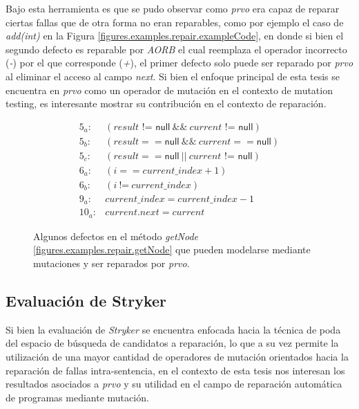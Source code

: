 Bajo esta herramienta es que se pudo observar como \emph{prvo} era capaz de reparar ciertas fallas que de otra forma no eran reparables, como por ejemplo el caso de \emph{add(int)} en la Figura \ref{figures.examples.repair.exampleCode}, en donde si bien el segundo defecto es reparable por \emph{AORB} el cual reemplaza el operador incorrecto (\emph{-}) por el que corresponde (\emph{+}), el primer defecto solo puede ser reparado por \emph{prvo} al eliminar el acceso al campo \emph{next}. Si bien el enfoque principal de esta tesis se encuentra en \emph{prvo} como un operador de mutaci\'on en el contexto de mutation testing, es interesante mostrar su contribuci\'on en el contexto de reparaci\'on.

\begin{figure}[t]
	\footnotesize
	$$
	\begin{array}{rl}
	5_a: & (\mathit{result} \mbox{ != }\mathsf{null}\ \&\&\ \mathit{current}\mbox{ != }\mathsf{null})\\
	5_b: & (\mathit{result} == \mathsf{null}\ \&\&\ \mathit{current} == \mathsf{null})\\
	5_c: & (\mathit{result} == \mathsf{null}\ ||\ \mathit{current}\mbox{ != }\mathsf{null})\\
	6_a: & (\mathit{i} == \mathit{current\_index} + 1)\\
	6_b: & (\mathit{i}\ \mbox{!=}\ \mathit{current\_index})\\
	9_a: & \mathit{current\_index} = \mathit{current\_index} - 1\\
	10_a: & \mathit{current.next} = \mathit{current}
	\end{array}
	$$
	\normalsize
	\caption{Algunos defectos en el m\'etodo \emph{getNode} \ref{figures.examples.repair.getNode} que pueden modelarse mediante mutaciones y ser reparados por \emph{prvo}.}
	\label{figures.examples.repair.faultsGetNode}
\end{figure}

\subsection{Evaluaci\'on de Stryker}
\label{sec:repair.striker.evaluation}

Si bien la evaluaci\'on de \emph{Stryker} se encuentra enfocada hacia la t\'ecnica de poda del espacio de b\'usqueda de candidatos a reparaci\'on, lo que a su vez permite la utilizaci\'on de una mayor cantidad de operadores de mutaci\'on orientados hacia la reparaci\'on de fallas intra-sentencia, en el contexto de esta tesis nos interesan los resultados asociados a \emph{prvo} y su utilidad en el campo de reparaci\'on autom\'atica de programas mediante mutaci\'on.

